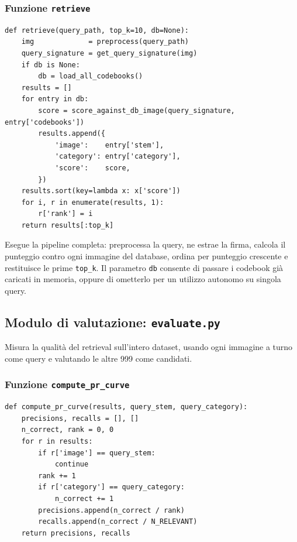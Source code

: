 \documentclass[12pt, a4paper]{article}
\begin{document}
\subsubsection{Funzione \texttt{retrieve}}

\begin{lstlisting}[caption={Funzione \texttt{retrieve}}]
def retrieve(query_path, top_k=10, db=None):
    img             = preprocess(query_path)
    query_signature = get_query_signature(img)
    if db is None:
        db = load_all_codebooks()
    results = []
    for entry in db:
        score = score_against_db_image(query_signature, entry['codebooks'])
        results.append({
            'image':    entry['stem'],
            'category': entry['category'],
            'score':    score,
        })
    results.sort(key=lambda x: x['score'])
    for i, r in enumerate(results, 1):
        r['rank'] = i
    return results[:top_k]
\end{lstlisting}

Esegue la pipeline completa: preprocessa la query, ne estrae la firma, calcola il punteggio
contro ogni immagine del database, ordina per punteggio crescente e restituisce le prime
\texttt{top\_k}. Il parametro \texttt{db} consente di passare i codebook già caricati in
memoria, oppure di ometterlo per un utilizzo autonomo su singola query.

\subsection{Modulo di valutazione: \texttt{evaluate.py}}

Misura la qualità del retrieval sull'intero dataset, usando ogni immagine a turno come query
e valutando le altre 999 come candidati.

\subsubsection{Funzione \texttt{compute\_pr\_curve}}

\begin{lstlisting}[caption={Funzione \texttt{compute\_pr\_curve}}]
def compute_pr_curve(results, query_stem, query_category):
    precisions, recalls = [], []
    n_correct, rank = 0, 0
    for r in results:
        if r['image'] == query_stem:
            continue
        rank += 1
        if r['category'] == query_category:
            n_correct += 1
        precisions.append(n_correct / rank)
        recalls.append(n_correct / N_RELEVANT)
    return precisions, recalls
\end{lstlisting}
\end{document}
